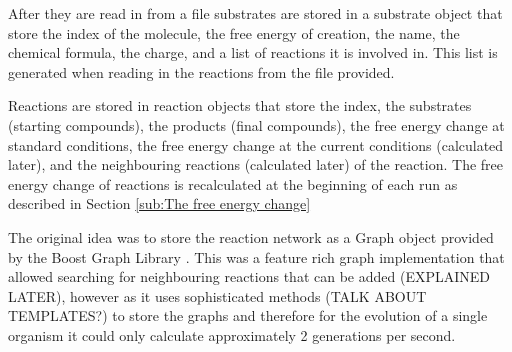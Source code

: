 \documentclass[10pt,a4paper]{article}
\begin{document}
	After they are read in from a file substrates are stored in a substrate object that store the index of the molecule, the free energy of creation, the name, the chemical formula, the charge, and a list of reactions it is involved in. This list is generated when reading in the reactions from the file provided.
	
	Reactions are stored in reaction objects that store the index, the substrates  (starting compounds), the products  (final compounds), the free energy change at standard conditions, the free energy change at the current conditions (calculated later), and the neighbouring reactions (calculated later) of the reaction. The free energy change of reactions is recalculated at the beginning of each run as described in Section \ref{sub:The free energy change}

	The original idea was to store the reaction network as a Graph object provided by the Boost Graph Library \cite{boostlibraries}. This was a feature rich graph implementation that allowed searching for neighbouring reactions that can be added (EXPLAINED LATER), however as it uses sophisticated methods (TALK ABOUT TEMPLATES?) to store the  graphs and therefore for the evolution of a single organism it could only calculate approximately 2 generations per second. 
	
	
\end{document}
